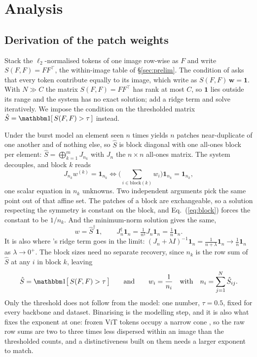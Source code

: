 \FloatBarrier
\section{Analysis}
\subsection{Derivation of the patch weights}
\label{app:ridge}
Stack the $\ell_2$-normalised tokens of one image row-wise as $F$ and write $S(F,F)=FF^{\top}$, the within-image table of \S\ref{sec:prelim}. The condition of \citet{democratic} asks that every token contribute equally to its image, which \citet{gmp} write as $S(F,F)\,\mathbf w=\mathbf 1$. With $N\gg C$ the matrix $S(F,F)=FF^{\top}$ has rank at most $C$, so $\mathbf 1$ lies outside its range and the system has no exact solution; \citet{gmp} add a ridge term and solve iteratively. We impose the condition on the thresholded matrix $\hat S=\ind[\,S(F,F)>\tau\,]$ instead.

Under the burst model an element seen $n$ times yields $n$ patches near-duplicate of one another and of nothing else, so $\hat S$ is block diagonal with one all-ones block per element: $\hat S=\bigoplus_{k=1}^{m}J_{n_k}$ with $J_n$ the $n\times n$ all-ones matrix. The system decouples, and block $k$ reads
\begin{equation}\label{eq:block}
  J_{n_k}w^{(k)}=\mathbf 1_{n_k}
  \iff
  \Big(\textstyle\sum_{i\in\mathrm{block}(k)}w_i\Big)\mathbf 1_{n_k}=\mathbf 1_{n_k},
\end{equation}
one scalar equation in $n_k$ unknowns. Two independent arguments pick the same point out of that affine set. The patches of a block are exchangeable, so a solution respecting the symmetry is constant on the block, and Eq.~(\ref{eq:block}) forces the constant to be $1/n_k$. And the minimum-norm solution gives the same,
\begin{equation}\label{eq:pinv}
  w=\hat S^{\dagger}\mathbf 1,
  \qquad
  J_n^{\dagger}\mathbf 1_n=\tfrac{1}{n^{2}}J_n\mathbf 1_n=\tfrac1n\mathbf 1_n .
\end{equation}
It is also where \citet{gmp}'s ridge term goes in the limit: $(J_n+\lambda I)^{-1}\mathbf 1_n=\tfrac{1}{n+\lambda}\mathbf 1_n\to\tfrac1n\mathbf 1_n$ as $\lambda\to0^{+}$. The block sizes need no separate recovery, since $n_k$ is the row sum of $\hat S$ at any $i$ in block $k$, leaving
\begin{equation}\label{eq:w}
  \hat S=\ind\big[\,S(F,F)>\tau\,\big]
  \qquad\text{and}\qquad
  w_i=\frac{1}{n_i}\quad\text{with}\quad n_i=\sum_{j=1}^{N}\hat S_{ij} .
\end{equation}
Only the threshold does not follow from the model: one number, $\tau{=}0.5$, fixed for every backbone and dataset. Binarising is the modelling step, and it is also what fixes the exponent at one: frozen ViT tokens occupy a narrow cone \citep{modalitygap,anisotropy}, so the raw row sums are two to three times less dispersed within an image than the thresholded counts, and a distinctiveness built on them needs a larger exponent to match.

